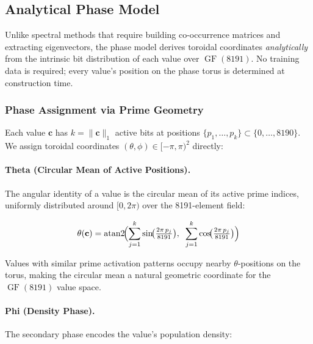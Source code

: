 \subsection{Analytical Phase Model}
\label{sec:eigenmode_cooccurrence}
\label{sec:eigenmode_navigation}

Unlike spectral methods that require building co-occurrence matrices and
extracting eigenvectors, the phase model derives toroidal coordinates
\emph{analytically} from the intrinsic bit distribution of each value over
$\operatorname{GF}(8191)$.  No training data is required; every value's position
on the phase torus is determined at construction time.

\subsubsection{Phase Assignment via Prime Geometry}

Each value $\mathbf{c}$ has $k = \|\mathbf{c}\|_1$ active bits at positions
$\{p_1, \ldots, p_k\} \subset \{0, \ldots, 8190\}$.  We assign toroidal
coordinates $(\theta, \phi) \in [-\pi, \pi)^2$ directly:

\paragraph{Theta (Circular Mean of Active Positions).}
The angular identity of a value is the circular mean of its active prime
indices, uniformly distributed around $[0, 2\pi)$ over the 8191-element field:

\begin{equation}
  \theta(\mathbf{c}) = \operatorname{atan2}\!\Bigl(
    \sum_{j=1}^{k} \sin\!\bigl(\tfrac{2\pi \, p_j}{8191}\bigr),\;\;
    \sum_{j=1}^{k} \cos\!\bigl(\tfrac{2\pi \, p_j}{8191}\bigr)
  \Bigr)
  \label{eq:theta_analytical}
\end{equation}

Values with similar prime activation patterns occupy nearby
$\theta$-positions on the torus, making the circular mean a natural
geometric coordinate for the $\operatorname{GF}(8191)$ value space.

\paragraph{Phi (Density Phase).}
The secondary phase encodes the value's population density:

